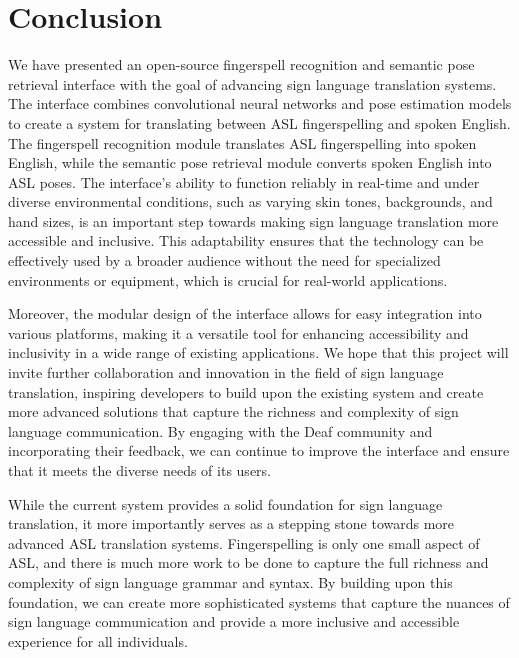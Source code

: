 \documentclass[../paper.tex]{subfiles}
\begin{document}
\section{Conclusion}
We have presented an open-source fingerspell recognition and semantic pose retrieval interface with the goal of advancing sign language translation systems. The interface combines convolutional neural networks and pose estimation models to create a system for translating between ASL fingerspelling and spoken English. The fingerspell recognition module translates ASL fingerspelling into spoken English, while the semantic pose retrieval module converts spoken English into ASL poses. The interface's ability to function reliably in real-time and under diverse environmental conditions, such as varying skin tones, backgrounds, and hand sizes, is an important step towards making sign language translation more accessible and inclusive. This adaptability ensures that the technology can be effectively used by a broader audience without the need for specialized environments or equipment, which is crucial for real-world applications.

Moreover, the modular design of the interface allows for easy integration into various platforms, making it a versatile tool for enhancing accessibility and inclusivity in a wide range of existing applications. We hope that this project will invite further collaboration and innovation in the field of sign language translation, inspiring developers to build upon the existing system and create more advanced solutions that capture the richness and complexity of sign language communication. By engaging with the Deaf community and incorporating their feedback, we can continue to improve the interface and ensure that it meets the diverse needs of its users.

While the current system provides a solid foundation for sign language translation, it more importantly serves as a stepping stone towards more advanced ASL translation systems. Fingerspelling is only one small aspect of ASL, and there is much more work to be done to capture the full richness and complexity of sign language grammar and syntax. By building upon this foundation, we can create more sophisticated systems that capture the nuances of sign language communication and provide a more inclusive and accessible experience for all individuals.
\end{document}
